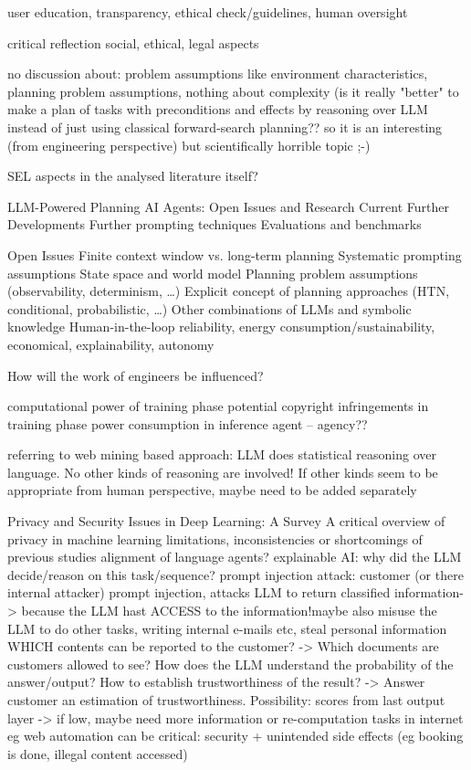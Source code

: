 \documentclass{article}
\begin{document}
user education, transparency, ethical check/guidelines, human oversight

critical reflection
social, ethical, legal aspects

no discussion about: problem assumptions like environment characteristics, planning problem assumptions, nothing about complexity (is it really "better" to make a plan of tasks with preconditions and effects by reasoning over LLM instead of just using classical forward-search planning??
so it is an interesting (from engineering perspective) but scientifically horrible topic ;-) 

SEL aspects in the analysed literature itself?

LLM-Powered Planning AI Agents: Open Issues and Research
Current Further Developments
Further prompting techniques
Evaluations and benchmarks

Open Issues
Finite context window vs. long-term planning
Systematic prompting assumptions
State space and world model
Planning problem assumptions (observability, determinism, …)
Explicit concept of planning approaches (HTN, conditional, probabilistic, …)
Other combinations of LLMs and symbolic knowledge
Human-in-the-loop
reliability, energy consumption/sustainability, economical, explainability, autonomy

How will the work of engineers be influenced?

computational power of training phase
potential copyright infringements in training phase
power consumption in inference
agent -- agency??

referring to \cite{davis_commonsense_2015} web mining based approach: LLM does statistical reasoning over language. No other kinds of reasoning are involved! If other kinds seem to be appropriate from human perspective, maybe need to be added separately

Privacy and Security Issues in Deep Learning: A Survey
A critical overview of privacy in machine learning
limitations, inconsistencies or shortcomings of previous studies
alignment of language agents? \cite{}
explainable AI: why did the LLM decide/reason on this task/sequence?
prompt injection
attack: customer (or there internal attacker) prompt injection, attacks LLM to return classified information-> because the LLM hast ACCESS to the information!maybe also misuse the LLM to do other tasks, writing internal e-mails etc, steal personal information
WHICH contents can be reported to the customer? -> Which documents are customers allowed to see?
How does the LLM understand the probability of the answer/output? How to establish trustworthiness of the result? -> Answer customer an estimation of trustworthiness.
Possibility: scores from last output layer -> if low, maybe need more information or re-computation
tasks in internet eg web automation can be critical: security + unintended side effects (eg booking is done, illegal content accessed)
\end{document}
